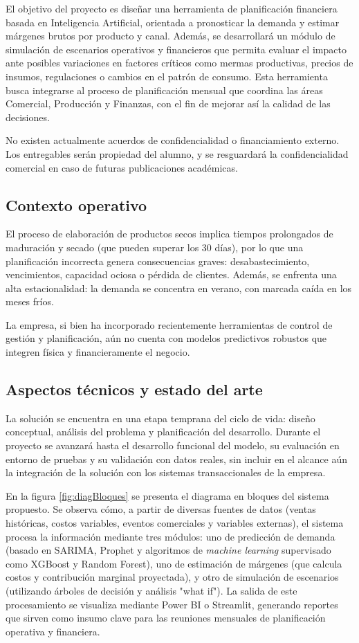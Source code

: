 \documentclass[
11pt, %
]{charter}
\begin{document}
El objetivo del proyecto es diseñar una herramienta de planificación financiera basada en Inteligencia Artificial, orientada a pronosticar la demanda y estimar márgenes brutos por producto y canal. Además, se desarrollará un módulo de simulación de escenarios operativos y financieros que permita evaluar el impacto ante posibles variaciones en factores críticos como mermas productivas, precios de insumos, regulaciones o cambios en el patrón de consumo. Esta herramienta busca integrarse al proceso de planificación mensual que coordina las áreas Comercial, Producción y Finanzas, con el fin de mejorar así la calidad de las decisiones.

No existen actualmente acuerdos de confidencialidad o financiamiento externo. Los entregables serán propiedad del alumno, y se resguardará la confidencialidad comercial en caso de futuras publicaciones académicas.

\subsection*{Contexto operativo}
El proceso de elaboración de productos secos implica tiempos prolongados de maduración y secado (que pueden superar los 30 días), por lo que una planificación incorrecta genera consecuencias graves: desabastecimiento, vencimientos, capacidad ociosa o pérdida de clientes. Además, se enfrenta una alta estacionalidad: la demanda se concentra en verano, con marcada caída en los meses fríos. 

La empresa, si bien ha incorporado recientemente herramientas de control de gestión y planificación, aún no cuenta con modelos predictivos robustos que integren física y financieramente el negocio.

\subsection*{Aspectos técnicos y estado del arte}
La solución se encuentra en una etapa temprana del ciclo de vida: diseño conceptual, análisis del problema y planificación del desarrollo. Durante el proyecto se avanzará hasta el desarrollo funcional del modelo, su evaluación en entorno de pruebas y su validación con datos reales, sin incluir en el alcance aún la integración de la solución con los sistemas transaccionales de la empresa.

En la figura \ref{fig:diagBloques} se presenta el diagrama en bloques del sistema propuesto. Se observa cómo, a partir de diversas fuentes de datos (ventas históricas, costos variables, eventos comerciales y variables externas), el sistema procesa la información mediante tres módulos: uno de predicción de demanda (basado en SARIMA, Prophet y algoritmos de \textit{machine learning} supervisado como XGBoost y Random Forest), uno de estimación de márgenes (que calcula costos y contribución marginal proyectada), y otro de simulación de escenarios (utilizando árboles de decisión y análisis "what if"). La salida de este procesamiento se visualiza mediante Power BI o Streamlit, generando reportes que sirven como insumo clave para las reuniones mensuales de planificación operativa y financiera.
\end{document}
